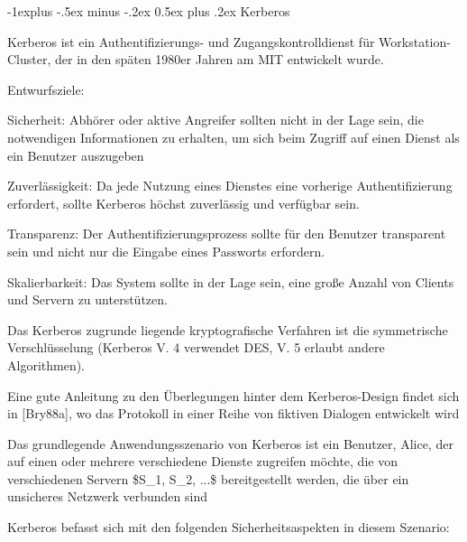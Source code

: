 \documentclass[a4paper]{article}
\makeatletter
\renewcommand{\subsection}{\@startsection{subsection}{2}{0mm}%
 {-1explus -.5ex minus -.2ex}%
 {0.5ex plus .2ex}%
 {\normalfont\normalsize\bfseries}}
\makeatother
\begin{document}
\begin{multicols}{3}
      \subsection{Kerberos}

      \begin{itemize*}
            \item
            Kerberos ist ein Authentifizierungs- und Zugangskontrolldienst für
            Workstation-Cluster, der in den späten 1980er Jahren am MIT entwickelt
            wurde.
            \item
            Entwurfsziele:

            \begin{itemize*}
                  \item Sicherheit: Abhörer oder aktive Angreifer sollten nicht in der Lage sein, die notwendigen Informationen zu erhalten, um sich beim Zugriff auf einen Dienst als ein Benutzer auszugeben
                  \item Zuverlässigkeit: Da jede Nutzung eines Dienstes eine vorherige Authentifizierung erfordert, sollte Kerberos höchst zuverlässig und verfügbar sein.
                  \item Transparenz: Der Authentifizierungsprozess sollte für den Benutzer transparent sein und nicht nur die Eingabe eines Passworts erfordern.
                  \item Skalierbarkeit: Das System sollte in der Lage sein, eine große Anzahl von Clients und Servern zu unterstützen.
            \end{itemize*}
            \item
            Das Kerberos zugrunde liegende kryptografische Verfahren ist die
            symmetrische Verschlüsselung (Kerberos V. 4 verwendet DES, V. 5
            erlaubt andere Algorithmen).
            \item
            Eine gute Anleitung zu den Überlegungen hinter dem Kerberos-Design
            findet sich in {[}Bry88a{]}, wo das Protokoll in einer Reihe von
            fiktiven Dialogen entwickelt wird
            \item
            Das grundlegende Anwendungsszenario von Kerberos ist ein Benutzer,
            Alice, der auf einen oder mehrere verschiedene Dienste zugreifen
            möchte, die von verschiedenen Servern \$S\_1, S\_2, ...\$
            bereitgestellt werden, die über ein unsicheres Netzwerk verbunden sind
            \item
            Kerberos befasst sich mit den folgenden Sicherheitsaspekten in diesem
            Szenario:


\end{itemize*}
\end{multicols}
\end{document}
